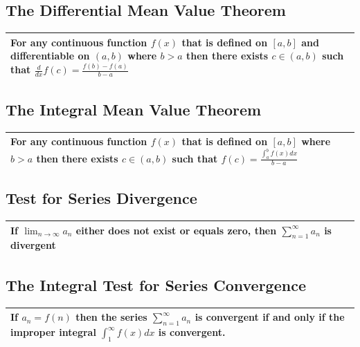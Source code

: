 \documentclass[12pt]{article}
\begin{document}
\begin{center}
\subsection*{\textbf{The Differential Mean Value Theorem}}
\begin{tabular}{ | p{\textwidth} |}
    \hline
    For any continuous function \( f(x) \) that is defined on \( [a, b] \) and differentiable on \( (a, b) \) where \( b > a \) then there exists \( c \in (a, b) \)
    such that \( \displaystyle\frac{ d }{ dx } f(c) = \displaystyle\frac{ f(b) - f(a) }{ b - a } \)
    \\ \hline
\end{tabular} 

\subsection*{\textbf{The Integral Mean Value Theorem}}
\begin{tabular}{ | p{\textwidth} |}
    \hline
    For any continuous function \( f(x) \) that is defined on \( [a, b] \) where \( b > a \) then there exists \( c \in (a, b) \)
    such that \( f(c) = \displaystyle\frac{\displaystyle\int_{a}^{b} { f(x) dx } }{ b - a } \)
    \\ \hline
\end{tabular}

\subsection*{\textbf{Test for Series Divergence}}
\begin{tabular}{ | p{\textwidth} |}
    \hline
    If \( \displaystyle\lim_{n \rightarrow{\infty}} { a_n } \) either does not exist or equals zero, then \( \displaystyle\sum_{n = 1}^{\infty} { a_n } \) is divergent
    \\ \hline
\end{tabular}

\subsection*{\textbf{The Integral Test for Series Convergence}}
\begin{tabular}{ | p{\textwidth} |}
    \hline
    If \( a_n = f(n) \) then the series \( \displaystyle\sum_{n = 1}^{\infty} { a_n } \) is convergent if and only if the improper integral 
    \( \displaystyle\int_{1}^{\infty} { f(x) dx } \) is convergent.
    \\ \hline
\end{tabular}


\end{center}
\end{document}
